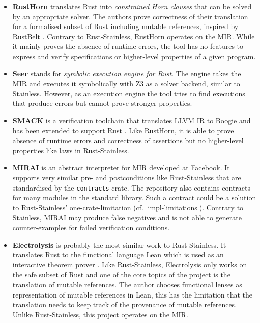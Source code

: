 \begin{itemize}

\item \textbf{RustHorn} \cite{rusthorn} translates Rust into \emph{constrained
Horn clauses} that can be solved by an appropriate solver. The authors prove
correctness of their translation for a formalised subset of Rust including
mutable references, inspired by RustBelt \cite{rustbelt}. Contrary to
Rust-Stainless, RustHorn operates on the MIR. While it mainly proves the absence
of runtime errors, the tool has no features to  express and verify
specifications or higher-level properties of a given program.

\item \textbf{Seer} \cite{seer} stands for \emph{symbolic execution engine for
Rust}. The engine takes the MIR and executes it symbolically with Z3 \cite{z3}
as a solver backend, similar to Stainless. However, as an execution engine the
tool tries to find executions that produce errors but cannot prove stronger
properties.

\item \textbf{SMACK} is a verification toolchain that translates LLVM IR to
Boogie \cite{boogie} and  has been extended to support Rust \cite{smack}. Like
RustHorn, it is able to prove absence of runtime errors and correctness of
assertions but no higher-level properties like laws in Rust-Stainless.

\item \textbf{MIRAI} \cite{mirai} is an abstract interpreter for MIR developed
at Facebook. It supports very similar pre- and postconditions like
Rust-Stainless that are standardised by the \lstinline!contracts! crate. The
repository also contains contracts for many modules in the standard library.
Such a contract could be a solution to Rust-Stainless' one-crate-limitation (cf.
\autoref{impl-limitations}).  Contrary to Stainless, MIRAI may produce false
negatives and  is not able to generate counter-examples for failed verification
conditions.

\item \textbf{Electrolysis} \cite{electrolysis} is probably the most similar
work to Rust-Stainless. It translates Rust to the functional language Lean which
is used as an interactive theorem prover \cite{lean}. Like Rust-Stainless,
Electrolysis only works on the safe subset of Rust and one of the core topics of
the project is the translation of mutable references. The author chooses
functional lenses as representation of mutable references in Lean, this has the
limitation that the translation needs to keep track of the provenance of mutable
references. Unlike Rust-Stainless, this project operates on the MIR.



\end{itemize}
